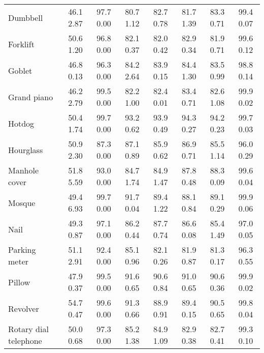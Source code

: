 \documentclass[10pt]{article} \usepackage[accepted]{stylefiles/tmlr}
\begin{document}
\begin{table*}[th]
\begin{tabular}{lccccccc}
Dumbbell & 46.1  2.87 & \multicolumn{1}{c|}{97.7  0.00} & 80.7  1.12 & \multicolumn{1}{c|}{82.7  0.78} & 81.7  1.39 & 83.3  0.71 & \multicolumn{1}{c}{99.4  0.07} \\
Forklift & 50.6  1.20 & \multicolumn{1}{c|}{96.8  0.00} & 82.1  0.37 & \multicolumn{1}{c|}{82.0  0.42} & 82.9  0.34 & 81.9  0.71 & \multicolumn{1}{c}{99.6  0.12} \\
Goblet & 46.8  0.13 & \multicolumn{1}{c|}{96.3  0.00} & 84.2  2.64 & \multicolumn{1}{c|}{83.9  0.15} & 84.4  1.30 & 83.5  0.99 & \multicolumn{1}{c}{98.8  0.14} \\
Grand piano & 46.2  2.79 & \multicolumn{1}{c|}{99.5  0.00} & 82.2  1.00 & \multicolumn{1}{c|}{82.4  0.01} & 83.4  0.71 & 82.6  1.08 & \multicolumn{1}{c}{99.9  0.02} \\
Hotdog & 50.4  1.74 & \multicolumn{1}{c|}{99.7  0.00} & 93.2  0.62 & \multicolumn{1}{c|}{93.9  0.49} & 94.3  0.27 & 94.2  0.23 & \multicolumn{1}{c}{99.7  0.03} \\
Hourglass & 50.9  2.30 & \multicolumn{1}{c|}{87.3  0.00} & 87.1  0.89 & \multicolumn{1}{c|}{85.9  0.62} & 86.9  0.71 & 85.5  1.14 & \multicolumn{1}{c}{96.0  0.29} \\
Manhole cover & 51.8  5.59 & \multicolumn{1}{c|}{93.0  0.00} & 84.7  1.74 & \multicolumn{1}{c|}{84.9  1.47} & 87.8  0.48 & 88.3  0.09 & \multicolumn{1}{c}{99.6  0.04} \\
Mosque & 49.4  6.93 & \multicolumn{1}{c|}{99.7  0.00} & 91.7  0.04 & \multicolumn{1}{c|}{89.4  1.22} & 88.1  0.84 & 89.1  0.29 & \multicolumn{1}{c}{99.9  0.06} \\
Nail & 49.3  0.87 & \multicolumn{1}{c|}{97.1  0.00} & 86.2  0.44 & \multicolumn{1}{c|}{87.7  0.74} & 86.6  0.08 & 85.4  1.49 & \multicolumn{1}{c}{97.0  0.05} \\
Parking meter & 51.1  2.91 & \multicolumn{1}{c|}{92.4  0.00} & 85.1  0.96 & \multicolumn{1}{c|}{82.1  0.26} & 81.9  0.87 & 81.3  0.17 & \multicolumn{1}{c}{96.3  0.55} \\
Pillow & 47.9  0.37 & \multicolumn{1}{c|}{99.5  0.00} & 91.6  0.65 & \multicolumn{1}{c|}{90.6  0.84} & 91.0  0.65 & 90.6  0.36 & \multicolumn{1}{c}{99.9  0.02} \\
Revolver & 54.7  0.47 & \multicolumn{1}{c|}{99.6  0.00} & 91.3  0.66 & \multicolumn{1}{c|}{88.9  0.91} & 89.4  0.15 & 90.5  0.65 & \multicolumn{1}{c}{99.8  0.04} \\
Rotary dial telephone & 50.0  0.68 & \multicolumn{1}{c|}{97.3  0.00} & 85.2  1.38 & \multicolumn{1}{c|}{84.9  1.09} & 82.9  0.38 & 82.7  0.41 & \multicolumn{1}{c}{99.3  0.10} \\

\end{tabular}
\end{table*}
\end{document}
